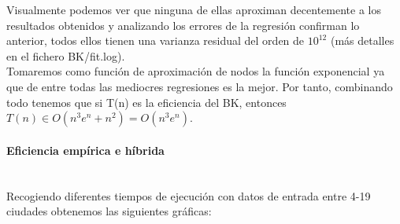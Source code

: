 \documentclass{article}
\newcommand{\myparagraph}[1]{\paragraph{#1}\mbox{}\\}
\begin{document}
Visualmente podemos ver que ninguna de ellas aproximan decentemente a 
los resultados obtenidos y analizando los errores de la regresión confirman lo anterior, todos ellos tienen una varianza residual del orden de $10^{12}$ (más detalles en el fichero BK/fit.log). \\

Tomaremos como función de aproximación de nodos la función exponencial 
ya que de entre todas las mediocres regresiones es la mejor. Por tanto, combinando todo tenemos que si T(n) es la eficiencia del BK, entonces
$T(n) \in O(n^3 e^n + n^2) = O(n^3 e^n)$. 

\myparagraph{Eficiencia empírica e híbrida}

Recogiendo diferentes tiempos de ejecución con datos de entrada entre 4-19 ciudades obtenemos las siguientes gráficas: 
\end{document}

